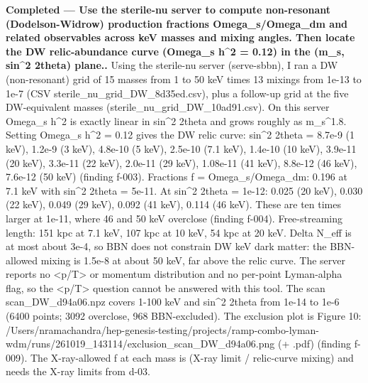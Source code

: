 \documentclass[11pt,a4paper]{article}
\begin{document}
\textbf{Completed --- Use the sterile-nu server to compute non-resonant (Dodelson-Widrow) production fractions Omega\_s/Omega\_dm and related observables across keV masses and mixing angles. Then locate the DW relic-abundance curve (Omega\_s h\textasciicircum{}2 = 0.12) in the (m\_s, sin\textasciicircum{}2 2theta) plane..} Using the sterile-nu server (serve-sbbn), I ran a DW (non-resonant) grid of 15 masses from 1 to 50 keV times 13 mixings from 1e-13 to 1e-7 (CSV sterile\_nu\_grid\_DW\_8d35ed.csv), plus a follow-up grid at the five DW-equivalent masses (sterile\_nu\_grid\_DW\_10ad91.csv). On this server Omega\_s h\textasciicircum{}2 is exactly linear in sin\textasciicircum{}2 2theta and grows roughly as m\_s\textasciicircum{}1.8. Setting Omega\_s h\textasciicircum{}2 = 0.12 gives the DW relic curve: sin\textasciicircum{}2 2theta = 8.7e-9 (1 keV), 1.2e-9 (3 keV), 4.8e-10 (5 keV), 2.5e-10 (7.1 keV), 1.4e-10 (10 keV), 3.9e-11 (20 keV), 3.3e-11 (22 keV), 2.0e-11 (29 keV), 1.08e-11 (41 keV), 8.8e-12 (46 keV), 7.6e-12 (50 keV) (finding f-003). Fractions f = Omega\_s/Omega\_dm: 0.196 at 7.1 keV with sin\textasciicircum{}2 2theta = 5e-11. At sin\textasciicircum{}2 2theta = 1e-12: 0.025 (20 keV), 0.030 (22 keV), 0.049 (29 keV), 0.092 (41 keV), 0.114 (46 keV). These are ten times larger at 1e-11, where 46 and 50 keV overclose (finding f-004). Free-streaming length: 151 kpc at 7.1 keV, 107 kpc at 10 keV, 54 kpc at 20 keV. Delta N\_eff is at most about 3e-4, so BBN does not constrain DW keV dark matter: the BBN-allowed mixing is 1.5e-8 at about 50 keV, far above the relic curve. The server reports no \textless{}p/T\textgreater{} or momentum distribution and no per-point Lyman-alpha flag, so the \textless{}p/T\textgreater{} question cannot be answered with this tool. The scan scan\_DW\_d94a06.npz covers 1-100 keV and sin\textasciicircum{}2 2theta from 1e-14 to 1e-6 (6400 points; 3092 overclose, 968 BBN-excluded). The exclusion plot is Figure 10: /Users/nramachandra/hep-genesis-testing/projects/ramp-combo-lyman-wdm/runs/261019\_143114/exclusion\_scan\_DW\_d94a06.png (+ .pdf) (finding f-009). The X-ray-allowed f at each mass is (X-ray limit / relic-curve mixing) and needs the X-ray limits from d-03.
\end{document}
